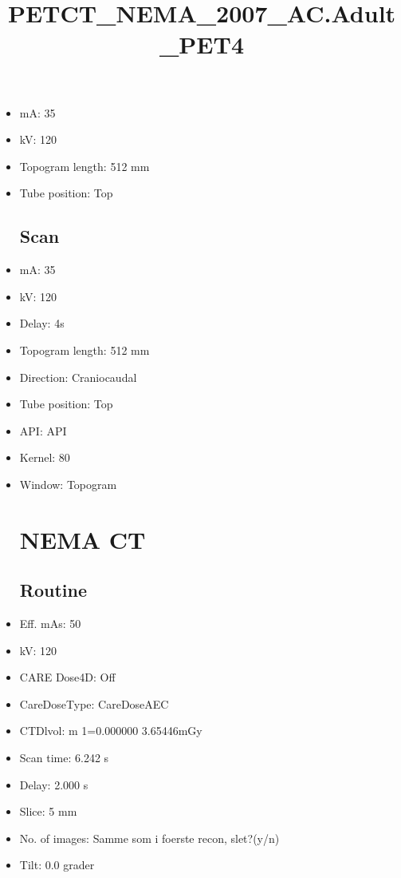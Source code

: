 \documentclass[12pt]{article}
\title{PETCT\_NEMA\_2007\_AC.Adult\_PET4}
\begin{document}
\maketitle
\newpage
\tableofcontents
\newpage
{}


\begin{itemize}\section{Topogram}
\subsection{Routine}
\item mA: 35\item kV: 120\item Topogram length: 512 mm\item Tube position: Top
\subsection{Scan}\item mA: 35\item kV: 120\item Delay: 4s\item Topogram length: 512 mm\item Direction: Craniocaudal\item Tube position: Top\item API: API \item Kernel: 80\item Window: Topogram
\section{NEMA CT}
\subsection{Routine}
\item Eff. mAs: 50\item kV: 120\item CARE Dose4D: Off\item CareDoseType: CareDoseAEC\item CTDlvol: m 1=0.000000 3.65446mGy\item Scan time: 6.242 s\item Delay: 2.000 s\item Slice: 5 mm\item No. of images: Samme som i foerste recon, slet?(y/n)\item Tilt: 0.0 grader

\end{itemize}
\end{document}
